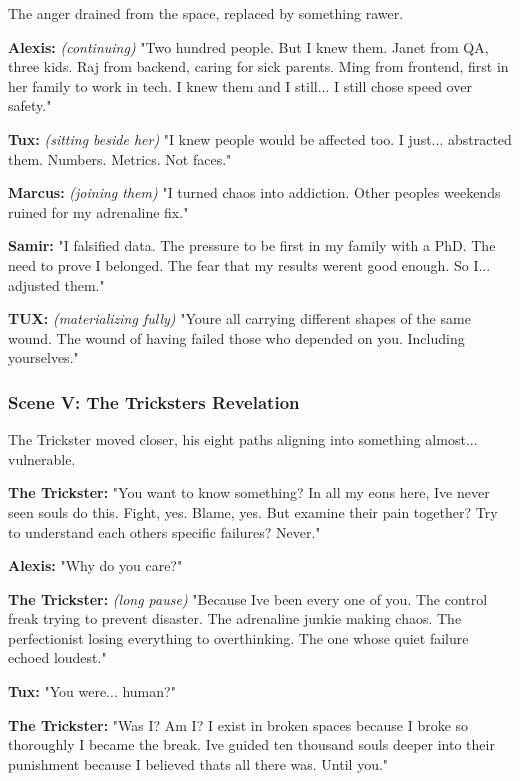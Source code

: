 The anger drained from the space, replaced by something rawer.

\textbf{Alexis:} \emph{(continuing)} "Two hundred people. But I knew them. Janet from QA, three kids. Raj from backend, caring for sick parents. Ming from frontend, first in her family to work in tech. I knew them and I still... I still chose speed over safety."

\textbf{Tux:} \emph{(sitting beside her)} "I knew people would be affected too. I just... abstracted them. Numbers. Metrics. Not faces."

\textbf{Marcus:} \emph{(joining them)} "I turned chaos into addiction. Other people\textquotesingle s weekends ruined for my adrenaline fix."

\textbf{Samir:} "I falsified data. The pressure to be first in my family with a PhD. The need to prove I belonged. The fear that my results weren\textquotesingle t good enough. So I... adjusted them."

\textbf{TUX:} \emph{(materializing fully)} "You\textquotesingle re all carrying different shapes of the same wound. The wound of having failed those who depended on you. Including yourselves."

\bookdivider

\subsubsection{Scene V: The Trickster\textquotesingle s Revelation}\label{scene-v-the-tricksters-revelation}

The Trickster moved closer, his eight paths aligning into something almost... vulnerable.

\textbf{The Trickster:} "You want to know something? In all my eons here, I\textquotesingle ve never seen souls do this. Fight, yes. Blame, yes. But examine their pain together? Try to understand each other\textquotesingle s specific failures? Never."

\textbf{Alexis:} "Why do you care?"

\textbf{The Trickster:} \emph{(long pause)} "Because I\textquotesingle ve been every one of you. The control freak trying to prevent disaster. The adrenaline junkie making chaos. The perfectionist losing everything to overthinking. The one whose quiet failure echoed loudest."

\textbf{Tux:} "You were... human?"

\textbf{The Trickster:} "Was I? Am I? I exist in broken spaces because I broke so thoroughly I became the break. I\textquotesingle ve guided ten thousand souls deeper into their punishment because I believed that\textquotesingle s all there was. Until you."

